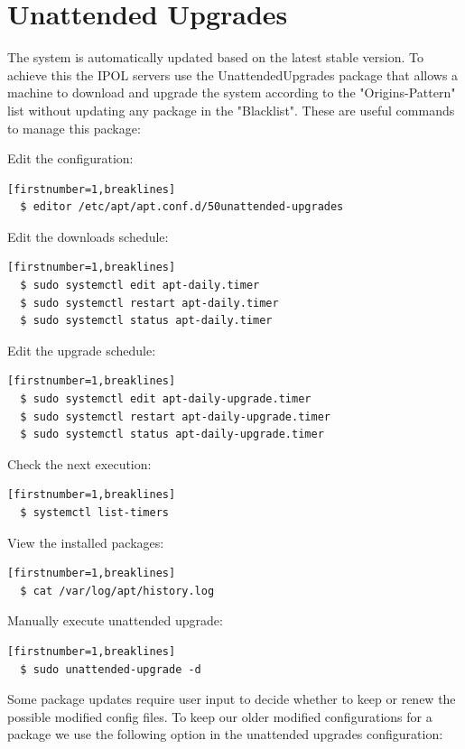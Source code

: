 \documentclass[a4paper,12pt]{article}
\begin{document}

\section{Unattended Upgrades}

The system is automatically updated based on the latest stable version. To achieve this the IPOL servers use the UnattendedUpgrades package that allows a machine to download and upgrade the system according to the "Origins-Pattern" list without updating any package in the "Blacklist". These are useful commands to manage this package: 

Edit the configuration: 
\begin{verbatim}[firstnumber=1,breaklines]
  $ editor /etc/apt/apt.conf.d/50unattended-upgrades
\end{verbatim}

Edit the downloads schedule: 
\begin{verbatim}[firstnumber=1,breaklines]
  $ sudo systemctl edit apt-daily.timer
  $ sudo systemctl restart apt-daily.timer
  $ sudo systemctl status apt-daily.timer
\end{verbatim}

Edit the upgrade schedule: 
\begin{verbatim}[firstnumber=1,breaklines]
  $ sudo systemctl edit apt-daily-upgrade.timer
  $ sudo systemctl restart apt-daily-upgrade.timer
  $ sudo systemctl status apt-daily-upgrade.timer
\end{verbatim}

Check the next execution: 
\begin{verbatim}[firstnumber=1,breaklines]
  $ systemctl list-timers
\end{verbatim}

View the installed packages: 
\begin{verbatim}[firstnumber=1,breaklines]
  $ cat /var/log/apt/history.log
\end{verbatim}

Manually execute unattended upgrade:
\begin{verbatim}[firstnumber=1,breaklines]
  $ sudo unattended-upgrade -d
\end{verbatim}

Some package updates require user input to decide whether to keep or renew the possible modified config files. To keep our older modified configurations for a package we use the following option in the unattended upgrades configuration:
\end{document}
